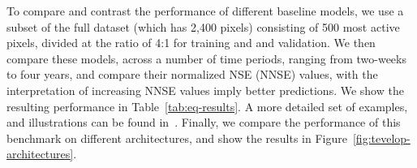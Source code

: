 \noindent To compare and contrast the performance of different baseline models, we use a subset of the full dataset (which has 2,400 pixels) consisting of 500 most active pixels, divided at the ratio of 4:1 for  training and and validation. We then compare these models, across a number of time periods, ranging from two-weeks to four years, and compare their normalized NSE (NNSE) values, with the interpretation of increasing NNSE values imply better predictions. We show the resulting performance in Table~\ref{tab:eq-results}. A more detailed set of examples, and illustrations can be found in~\cite{fox2022-jm}. Finally, we compare the performance of this benchmark on different architectures, and show the results in Figure~\ref{fig:tevelop-architectures}. 










    